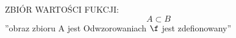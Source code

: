 \documentclass{article}
\begin{document}
ZBIÓR WARTOŚCI FUKCJI:
    \[A \subset B\]
    ''obraz zbioru A jest Odwzorowaniach $\f$ jest zdefionowany''
\end{document}
